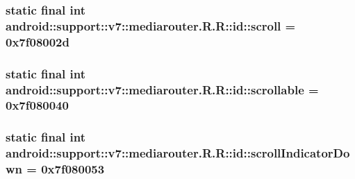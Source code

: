 \hypertarget{classandroid_1_1support_1_1v7_1_1mediarouter_1_1_r_1_1id_648b6eafbb33cfd42504c7ea49a44d3a}{
\subsubsection[{scroll}]{\setlength{\rightskip}{0pt plus 5cm}static final int android::support::v7::mediarouter.R.R::id::scroll = 0x7f08002d}}
\label{classandroid_1_1support_1_1v7_1_1mediarouter_1_1_r_1_1id_648b6eafbb33cfd42504c7ea49a44d3a}


\hypertarget{classandroid_1_1support_1_1v7_1_1mediarouter_1_1_r_1_1id_135b15f21873c2b4a73bc076d4477bde}{
\subsubsection[{scrollable}]{\setlength{\rightskip}{0pt plus 5cm}static final int android::support::v7::mediarouter.R.R::id::scrollable = 0x7f080040}}
\label{classandroid_1_1support_1_1v7_1_1mediarouter_1_1_r_1_1id_135b15f21873c2b4a73bc076d4477bde}


\hypertarget{classandroid_1_1support_1_1v7_1_1mediarouter_1_1_r_1_1id_6622844d0d11e089aaf9ffc002eadb16}{
\subsubsection[{scrollIndicatorDown}]{\setlength{\rightskip}{0pt plus 5cm}static final int android::support::v7::mediarouter.R.R::id::scrollIndicatorDown = 0x7f080053}}
\label{classandroid_1_1support_1_1v7_1_1mediarouter_1_1_r_1_1id_6622844d0d11e089aaf9ffc002eadb16}


